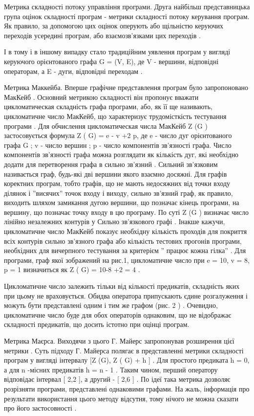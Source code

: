 Метрика складності потоку управління програми.
Друга найбільш представницька група оцінок складності програм - метрики складності потоку керування програм. Як правило, за допомогою цих оцінок оперують або щільністю керуючих переходів усередині програм, або взаємозв'язками цих переходів .

І в тому і в іншому випадку стало традиційним уявлення програм у вигляді керуючого орієнтованого графа G = (V, E), де V - вершини, відповідні операторам, а E - дуги, відповідні переходам .

Метрика Маккейба.
Вперше графічне представлення програм було запропоновано МакКейб . Основний метрикою складності він пропонує вважати цикломатическая складність графа програми, або, як її ще називають, цикломатичне число МакКейб, що характеризує трудомісткість тестування програми .
Для обчислення цикломатическая числа МакКейб Z (G ) застосовується формула
Z ( G) = e - v +2 p,
де e - число дуг орієнтованого графа G ;
v - число вершин ;
p - число компонентів зв'язності графа.
Число компонентів зв'язності графа можна розглядати як кількість дуг, які необхідно додати для перетворення графа в сильно зв'язний . Сильний зв'язковим називається граф, будь-які дві вершини якого взаємно досяжні. Для графів коректних програм, тобто графів, що не мають недосяжних від точки входу ділянок і ''висячих'' точок входу і виходу, сильно зв'язний граф, як правило, виходить шляхом замикання дугою вершини, що позначає кінець програми, на вершину, що позначає точку входу в цю програму.
По суті Z (G ) визначає число лінійно незалежних контурів у Сильно зв'язкового графі . Інакше кажучи, цикломатичне число МакКейб показує необхідну кількість проходів для покриття всіх контурів сильно зв'язного графа або кількість тестових прогонів програми, необхідних для вичерпного тестування за критерієм '' працює кожна гілка'' .
Для програми, граф якої зображений на рис.1, цикломатичне число при e = 10, v = 8, p = 1 визначиться як Z ( G) = 10-8 +2 = 4 .

Цикломатичне число залежить тільки від кількості предикатів, складність яких при цьому не враховується. 
Обидва оператора припускають єдине розгалуження і можуть бути представлені одним і тим же графом (рис. 2 ) . Очевидно, цикломатичне число буде для обох операторів однаковим, що не відображає складності предикатів, що досить істотно при оцінці програм.

Метрика Маєрса.
Виходячи з цього Г. Майерс запропонував розширення цієї метрики . Суть підходу Г. Майерса полягає в представленні метрики складності програм у вигляді інтервалу {[}Z (G), Z ( G) + h {]} . Для простого предиката h = 0, а для n -місних предикатів h = n - 1 . Таким чином, перший оператору відповідає інтервал {[} 2,2 {]}, а другий - {[} 2,6 {]} .
По ідеї така метрика дозволяє розрізняти програми, представлені однаковими графами. На жаль, інформація про результати використання цього методу відсутня, тому нічого не можна сказати про його застосовності .

